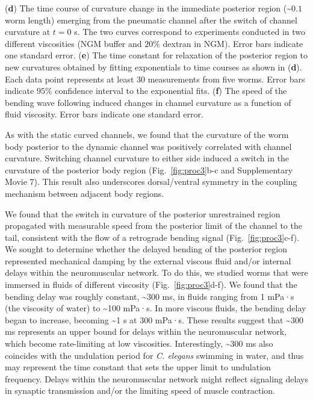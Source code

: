 \begin{FPfigure}
{(\textbf{d}) The time course of curvature change in the immediate posterior region (\textasciitilde$0.1$ worm length) 
emerging from the pneumatic channel after the switch of channel curvature at $t = 0$ s. The two 
curves correspond to experiments conducted in two different viscosities (NGM buffer and $20\%$ 
dextran in NGM). Error bars indicate one standard error.  
(\textbf{e}) The time constant for relaxation of the posterior region to new curvatures obtained by fitting 
exponentials to time courses as shown in (\textbf{d}). Each data point represents at least $30$ 
measurements from five worms. Error bars indicate $95\%$ confidence interval to the exponential 
fits.  
(\textbf{f}) The speed of the bending wave following induced changes in channel curvature as a function 
of fluid viscosity. Error bars indicate one standard error.\label{fig:proc3}}
\end{FPfigure}


As with the static curved channels, we found that the curvature of the worm body posterior to the 
dynamic channel was positively correlated with channel curvature. Switching channel curvature 
to either side induced a switch in the curvature of the posterior body region (Fig.~\ref{fig:proc3}b-c and 
Supplementary Movie 7). This result also underscores dorsal/ventral symmetry in the coupling 
mechanism between adjacent body regions. 

We found that the switch in curvature of the posterior unrestrained region propagated with 
measurable speed from the posterior limit of the channel to the tail, consistent with the flow of a 
retrograde bending signal (Fig.~\ref{fig:proc3}c-f). We sought to determine whether the delayed bending of the 
posterior region represented mechanical damping by the external viscous fluid and/or internal 
delays within the neuromuscular network. To do this, we studied worms that were immersed in 
fluids of different viscosity (Fig.~\ref{fig:proc3}d-f). We found that the bending delay was roughly constant, 
\textasciitilde300 ms, in fluids ranging from 1 mPa·s (the viscosity of water) to \textasciitilde100 mPa·s. In more viscous 
fluids, the bending delay began to increase, becoming \textasciitilde1 s at $300$ mPa·s. These results suggest 
that \textasciitilde300 ms represents an upper bound for delays within the neuromuscular network, which 
become rate-limiting at low viscosities. Interestingly, \textasciitilde300 ms also coincides with the undulation 
period for \textit{C. elegans} swimming in water, and thus may represent the time constant that sets the 
upper limit to undulation frequency. Delays within the neuromuscular network might reflect 
signaling delays in synaptic transmission and/or the limiting speed of muscle contraction.

